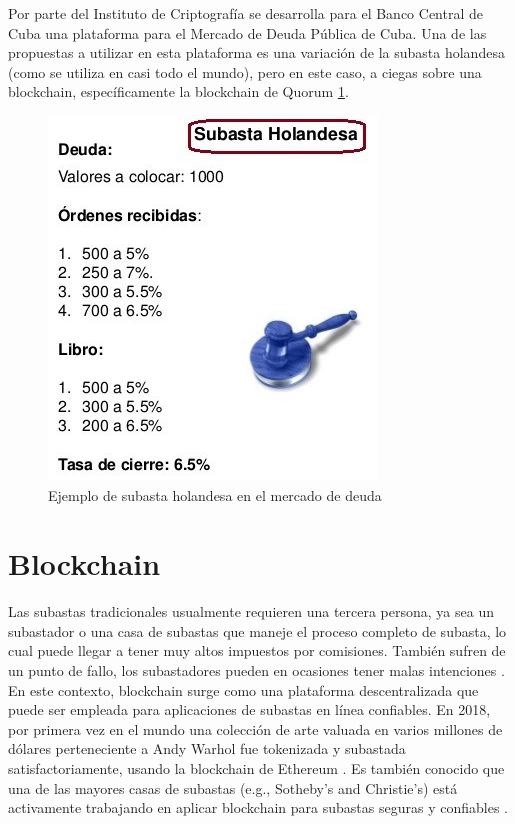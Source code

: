     Por parte del Instituto de Criptografía se desarrolla para el Banco Central de Cuba una plataforma para el Mercado de Deuda Pública de 
    Cuba. Una de las propuestas a utilizar en esta plataforma es una variación de la subasta holandesa (como se utiliza en casi todo el 
    mundo), pero en este caso, a ciegas sobre una blockchain, específicamente la blockchain de Quorum \ref{dutch_auction}.

    \begin{figure}[H]
      \center
      \includegraphics[scale=0.7]{photos/subasta-holandesa1.jpg}
      \caption{Ejemplo de subasta holandesa en el mercado de deuda}
      \label{dutch_auction}
    \end{figure}

\section{Blockchain} \hspace*{}
  Las subastas tradicionales usualmente requieren una tercera persona, ya sea un subastador o una 
  casa de subastas que maneje el proceso completo de subasta, lo cual puede llegar a tener muy altos
  impuestos por comisiones. También sufren de un punto de fallo, los subastadores pueden en ocasiones 
  tener malas intenciones \parencite{wu2019}. En este contexto, blockchain surge como una plataforma descentralizada que
  puede ser empleada para aplicaciones de subastas en línea confiables. En 2018, por primera vez en el 
  mundo una colección de arte valuada en varios millones de dólares perteneciente a Andy Warhol fue tokenizada
  y subastada satisfactoriamente, usando la blockchain de Ethereum \parencite{wood2021,emem}. Es también
  conocido que una de las mayores casas de subastas (e.g., Sotheby’s and Christie’s) está activamente
  trabajando en aplicar blockchain para subastas seguras y confiables \parencite{neuendorf2018}. 

